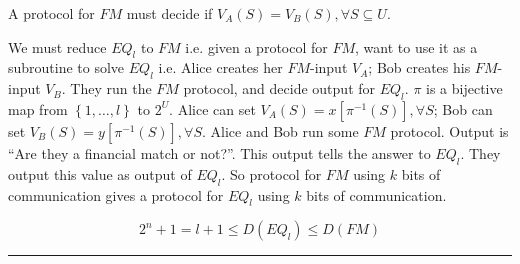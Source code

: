 \documentclass[twoside]{article}
\newenvironment{proof}{{\bf Proof:}}{\hfill\rule{2mm}{2mm}}
\newcommand{\set}[1]{\left \{ #1 \right \}}
\begin{document}
\begin{proof}
\begin{multicols}{2}
        A protocol for $FM$ must decide if $V_A(S) = V_B(S), \forall S \subseteq U$.
    \end{multicols}

    We must reduce $EQ_l$ to $FM$ i.e. given a protocol for $FM$, want to use it as a subroutine to solve $EQ_l$ i.e. Alice creates her $FM$-input $V_A$; Bob creates his $FM$-input $V_B$. They run the $FM$ protocol, and decide output for $EQ_l$. $\pi$ is a bijective map from $\set{1, \ldots, l}$ to $2^U$. Alice can set $V_A(S) = x[\pi^{-1}(S)], \forall S$; Bob can set $V_B(S) = y[\pi^{-1}(S)], \forall S$. Alice and Bob run some $FM$ protocol. Output is ``Are they a financial match or not?''. This output tells the answer to $EQ_l$. They output this value as output of $EQ_l$. So protocol for $FM$ using $k$ bits of communication gives a protocol for $EQ_l$ using $k$ bits of communication.

    \begin{equation*}
        2^n + 1 = l + 1 \leq D(EQ_l) \leq D(FM)
    \end{equation*}
\end{proof}
\end{document}
